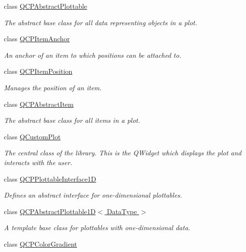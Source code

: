 \begin{DoxyCompactItemize}
class \hyperlink{class_q_c_p_abstract_plottable}{Q\+C\+P\+Abstract\+Plottable}
\begin{DoxyCompactList}\small\item\em The abstract base class for all data representing objects in a plot. \end{DoxyCompactList}\item 
class \hyperlink{class_q_c_p_item_anchor}{Q\+C\+P\+Item\+Anchor}
\begin{DoxyCompactList}\small\item\em An anchor of an item to which positions can be attached to. \end{DoxyCompactList}\item 
class \hyperlink{class_q_c_p_item_position}{Q\+C\+P\+Item\+Position}
\begin{DoxyCompactList}\small\item\em Manages the position of an item. \end{DoxyCompactList}\item 
class \hyperlink{class_q_c_p_abstract_item}{Q\+C\+P\+Abstract\+Item}
\begin{DoxyCompactList}\small\item\em The abstract base class for all items in a plot. \end{DoxyCompactList}\item 
class \hyperlink{class_q_custom_plot}{Q\+Custom\+Plot}
\begin{DoxyCompactList}\small\item\em The central class of the library. This is the Q\+Widget which displays the plot and interacts with the user. \end{DoxyCompactList}\item 
class \hyperlink{class_q_c_p_plottable_interface1_d}{Q\+C\+P\+Plottable\+Interface1D}
\begin{DoxyCompactList}\small\item\em Defines an abstract interface for one-\/dimensional plottables. \end{DoxyCompactList}\item 
class \hyperlink{class_q_c_p_abstract_plottable1_d}{Q\+C\+P\+Abstract\+Plottable1\+D$<$ Data\+Type $>$}
\begin{DoxyCompactList}\small\item\em A template base class for plottables with one-\/dimensional data. \end{DoxyCompactList}\item 
class \hyperlink{class_q_c_p_color_gradient}{Q\+C\+P\+Color\+Gradient}

\end{DoxyCompactItemize}
